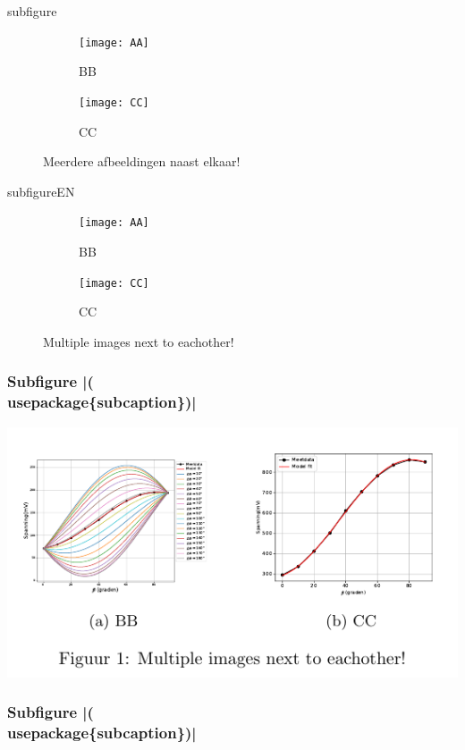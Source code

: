 \begin{saveblock}{subfigure}
	\begin{highlightblock}[linewidth=0.95\textwidth,framexleftmargin=0.25em]
		\begin{figure}[htbp]
			\centering
			\begin{subfigure}[b]{0.45\textwidth}
				\texttt{[image: AA]}
				\caption{BB}
				\label{fig:dphiExample}
			\end{subfigure}\qquad
			\begin{subfigure}[b]{0.45\textwidth}
				\texttt{[image: CC]}
				\caption{CC}
				\label{fig:fitExample}
			\end{subfigure}
			\caption{Meerdere afbeeldingen naast elkaar!}
		\end{figure}
	\end{highlightblock}
\end{saveblock}

\begin{saveblock}{subfigureEN}
	\begin{highlightblock}[linewidth=0.95\textwidth,framexleftmargin=0.25em]
		\begin{figure}[htbp]
			\centering
			\begin{subfigure}[b]{0.45\textwidth}
				\texttt{[image: AA]}
				\caption{BB}
				\label{fig:dphiExample}
			\end{subfigure}\qquad
			\begin{subfigure}[b]{0.45\textwidth}
				\texttt{[image: CC]}
				\caption{CC}
				\label{fig:fitExample}
			\end{subfigure}
			\caption{Multiple images next to eachother!}
		\end{figure}
	\end{highlightblock}
\end{saveblock}


\begin{frame}
	\frametitle{Subfigure \hll|(\\usepackage\{subcaption\})|}

	\centering
	\includegraphics[width=\textwidth,height=0.8\textheight,keepaspectratio]{assets/outdir/subfigure}
\end{frame}

\begin{frame}
	\frametitle{Subfigure \hll|(\\usepackage\{subcaption\})|}

\end{frame}
